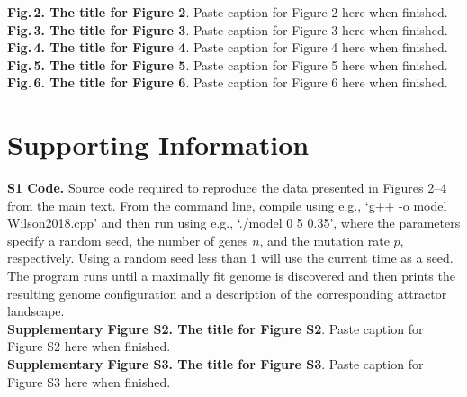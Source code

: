 \documentclass[10pt,letterpaper]{article}
\begin{document}
\noindent\textbf{Fig.\,2. The title for Figure 2}. Paste caption for Figure 2 here when finished.
\vspace{1em}\\

\noindent\textbf{Fig.\,3. The title for Figure 3}. Paste caption for Figure 3 here when finished.
\vspace{1em}\\

\noindent\textbf{Fig.\,4. The title for Figure 4}. Paste caption for Figure 4 here when finished.
\vspace{1em}\\

\noindent\textbf{Fig.\,5. The title for Figure 5}. Paste caption for Figure 5 here when finished.
\vspace{1em}\\

\noindent\textbf{Fig.\,6. The title for Figure 6}. Paste caption for Figure 6 here when finished.
\vspace{1em}\\


\section*{Supporting Information}

\noindent\textbf{S1 Code.} Source code required to reproduce the data presented in Figures 2--4 from the main text. From the command line, compile using e.g., `g++ -o model Wilson2018.cpp' and then run using e.g., `./model 0 5 0.35', where the parameters specify a random seed, the number of genes $n$, and the mutation rate $p$, respectively. Using a random seed less than 1 will use the current time as a seed. The program runs until a maximally fit genome is discovered and then prints the resulting genome configuration and a description of the corresponding attractor landscape.\\


\noindent\textbf{Supplementary Figure S2. The title for Figure S2}. Paste caption for Figure S2 here when finished.
\vspace{1em}\\

\noindent\textbf{Supplementary Figure S3. The title for Figure S3}. Paste caption for Figure S3 here when finished.
\vspace{1em}\\
\end{document}
